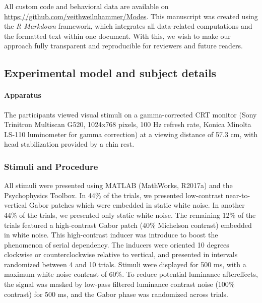 \documentclass[
]{article}
\begin{document}
All custom code and behavioral data are available on
\url{https://github.com/veithweilnhammer/Modes}. This manuscript was
created using the \emph{R Markdown} framework, which integrates all
data-related computations and the formatted text within one document.
With this, we wish to make our approach fully transparent and
reproducible for reviewers and future readers.

\hypertarget{experimental-model-and-subject-details}{%
\subsection{Experimental model and subject
details}\label{experimental-model-and-subject-details}}

\hypertarget{apparatus}{%
\paragraph{Apparatus}\label{apparatus}}

The participants viewed visual stimuli on a gamma-corrected CRT monitor
(Sony Trinitron Multiscan G520, 1024x768 pixels, 100 Hz refresh rate,
Konica Minolta LS-110 luminometer for gamma correction) at a viewing
distance of 57.3 cm, with head stabilization provided by a chin rest.

\hypertarget{stimuli-and-procedure}{%
\subsubsection{Stimuli and Procedure}\label{stimuli-and-procedure}}

All stimuli were presented using MATLAB (MathWorks, R2017a) and the
Psychophysics Toolbox. In 44\% of the trials, we presented low-contrast
near-to-vertical Gabor patches which were embedded in static white
noise. In another 44\% of the trials, we presented only static white
noise. The remaining 12\% of the trials featured a high-contrast Gabor
patch (40\% Michelson contrast) embedded in white noise. This
high-contrast inducer was introduce to boost the phenomenon of serial
dependency. The inducers were oriented 10 degrees clockwise or
counterclockwise relative to vertical, and presented in intervals
randomized between 4 and 10 trials. Stimuli were displayed for 500 ms,
with a maximum white noise contrast of 60\%. To reduce potential
luminance aftereffects, the signal was masked by low-pass filtered
luminance contrast noise (100\% contrast) for 500 ms, and the Gabor
phase was randomized across trials.
\end{document}
